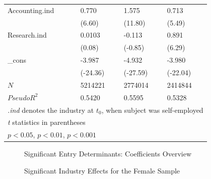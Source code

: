 \begin{longtable}{p{3 cm} p{2.25 cm} p{2.25 cm} p{2.25 cm}}
Accounting.ind &       0.770\sym{***}&       1.575\sym{***}&       0.713\sym{***}\\
            &      (6.60)         &     (11.80)         &      (5.49)         \\
Research.ind &      0.0103         &      -0.113 &      0.891\sym{***}         \\
            &      (0.08)         &      (-0.85)        &      (6.29)        \\
\_cons      &      -3.987\sym{***}&      -4.932\sym{***}&      -3.980\sym{***}\\
            &    (-24.36)         &    (-27.59)         &    (-22.04)         \\
\hline
\(N\)       &     5214221         &     2774014         &     2414844         \\
\(Pseudo R^2\)       &   0.5420         &    0.5595       &    0.5328      \\
\hline\hline
\multicolumn{4}{l}{\footnotesize \textit{.ind} denotes the industry at $t_0$, when subject was self-employed}\\
\multicolumn{4}{l}{\footnotesize \textit{t} statistics in parentheses}\\
\multicolumn{4}{l}{\footnotesize \sym{*} \(p<0.05\), \sym{**} \(p<0.01\), \sym{***} \(p<0.001\)}\\
\end{longtable}
\bodyspacing

\begin{figure}
    \caption{Significant Entry Determinants: Coefficients Overview}
    \label{fig:awesome_image}
\end{figure}




\begin{figure}[hbtp]
    \caption{Significant Industry Effects for the Female Sample} 
\end{figure}

